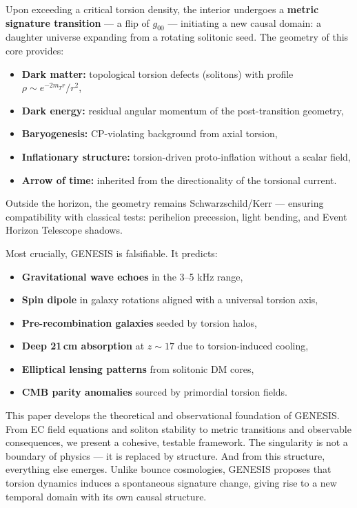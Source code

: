 \documentclass{article}
\begin{document}
Upon exceeding a critical torsion density, the interior undergoes a \textbf{metric signature transition} — a flip of $g_{00}$ — initiating a new causal domain: a daughter universe expanding from a rotating solitonic seed. The geometry of this core provides:
\begin{itemize}
  \item \textbf{Dark matter:} topological torsion defects (solitons) with profile $\rho \sim e^{-2 m_T r}/r^2$,
  \item \textbf{Dark energy:} residual angular momentum of the post-transition geometry,
  \item \textbf{Baryogenesis:} CP-violating background from axial torsion,
  \item \textbf{Inflationary structure:} torsion-driven proto-inflation without a scalar field,
  \item \textbf{Arrow of time:} inherited from the directionality of the torsional current.
\end{itemize}

Outside the horizon, the geometry remains Schwarzschild/Kerr — ensuring compatibility with classical tests: perihelion precession, light bending, and Event Horizon Telescope shadows.

\vspace{1ex}

Most crucially, GENESIS is falsifiable. It predicts:
\begin{itemize}
  \item \textbf{Gravitational wave echoes} in the 3–5 kHz range,
  \item \textbf{Spin dipole} in galaxy rotations aligned with a universal torsion axis,
  \item \textbf{Pre-recombination galaxies} seeded by torsion halos,
  \item \textbf{Deep 21\,cm absorption} at $z \sim 17$ due to torsion-induced cooling,
  \item \textbf{Elliptical lensing patterns} from solitonic DM cores,
  \item \textbf{CMB parity anomalies} sourced by primordial torsion fields.
\end{itemize}

\vspace{1ex}

This paper develops the theoretical and observational foundation of GENESIS. From EC field equations and soliton stability to metric transitions and observable consequences, we present a cohesive, testable framework. The singularity is not a boundary of physics — it is replaced by structure. And from this structure, everything else emerges. 
Unlike bounce cosmologies, GENESIS proposes that torsion dynamics induces a spontaneous signature change, giving rise to a new temporal domain with its own causal structure.
\end{document}
